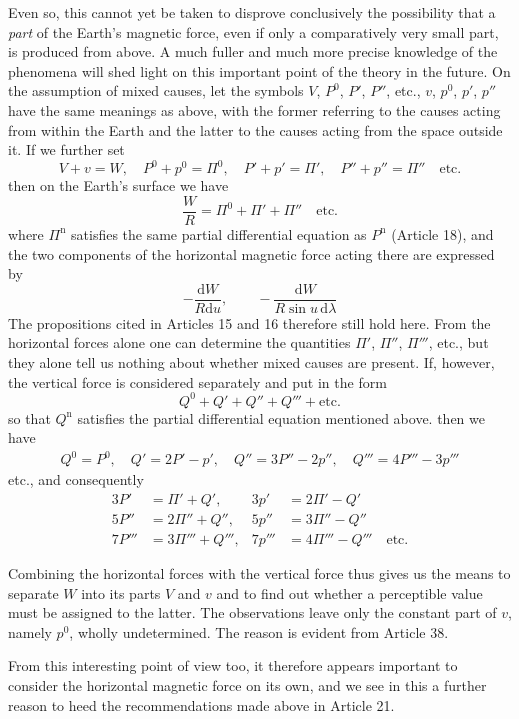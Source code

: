 Even so, this cannot yet be taken to disprove conclusively the possibility that a \textit{part} of the Earth's magnetic force, even if only a comparatively very small part, is produced from above. A much fuller and much more precise knowledge of the phenomena will shed light on this important point of the theory in the future. On the assumption of mixed causes, let the symbols $V$, $P^0$, $P'$, $P''$, etc., $v$, $p^0$, $p'$, $p''$ have the same meanings as above, with the former referring to the causes acting from within the Earth and the latter to the causes acting from the space outside it. If we further set
\[
V+v=W,\quad P^0+p^0=\Pi^0,\quad P'+p'=\Pi',\quad P''+p''=\Pi''\quad\text{etc.}
\]
then on the Earth's surface we have
\[
\frac WR=\Pi^0+\Pi'+\Pi''\quad\text{etc.}
\]
where $\Pi^{\mathrm n}$ satisfies the same partial differential equation as $P^{\mathrm n}$ (Article 18), and the two components of the horizontal magnetic force acting there are expressed by
\[
-\frac{\mathrm dW}{R\mathrm du},\qquad-\frac{\mathrm dW}{R\sin u\,\mathrm d\lambda}
\]
The propositions cited in Articles 15 and 16 therefore still hold here. From the horizontal forces alone one can determine the quantities $\Pi'$, $\Pi''$, $\Pi'''$, etc., but they alone tell us nothing about whether mixed causes are present. If, however, the vertical force is considered separately and put in the form
\[
Q^0+Q'+Q''+Q'''+\text{etc.}
\]
so that $Q^{\mathrm n}$ satisfies the partial differential equation mentioned above. then we have
\[
\begin{gathered}
Q^0=P^0,\quad Q'=2P'-p',\quad Q''=3P''-2p'',\quad Q'''=4P'''-3p'''
\end{gathered}
\]
etc., and consequently
\[
\begin{aligned}
3P'&=\Pi'+Q',&3p'&=2\Pi'-Q'\\
5P''&=2\Pi''+Q'',&5p''&=3\Pi''-Q''\\
7P'''&=3\Pi'''+Q''',&7p'''&=4\Pi'''-Q'''\quad\text{etc.}
\end{aligned}
\]

Combining the horizontal forces with the vertical force thus gives us the means to separate $W$ into its parts $V$ and $v$ and to find out whether a perceptible value must be assigned to the latter. The observations leave only the constant part of $v$, namely $p^0$, wholly undetermined. The reason is evident from Article 38.

From this interesting point of view too, it therefore appears important to consider the horizontal magnetic force on its own, and we see in this a further reason to heed the recommendations made above in Article 21.

